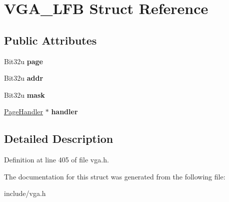 \hypertarget{structVGA__LFB}{\section{V\-G\-A\-\_\-\-L\-F\-B Struct Reference}
\label{structVGA__LFB}
}
\subsection*{Public Attributes}
\begin{DoxyCompactItemize}
\item 
\hypertarget{structVGA__LFB_ac33c6c75c1e64552c88293115b1c1196}{Bit32u {\bfseries page}}\label{structVGA__LFB_ac33c6c75c1e64552c88293115b1c1196}

\item 
\hypertarget{structVGA__LFB_ad82dd223ea49e44ed0958ff21ae15f1d}{Bit32u {\bfseries addr}}\label{structVGA__LFB_ad82dd223ea49e44ed0958ff21ae15f1d}

\item 
\hypertarget{structVGA__LFB_aaf0a31db50d61b55ed20a81fb94de57c}{Bit32u {\bfseries mask}}\label{structVGA__LFB_aaf0a31db50d61b55ed20a81fb94de57c}

\item 
\hypertarget{structVGA__LFB_ac84a223414c76edc5fbd6742bfd8c720}{\hyperlink{classPageHandler}{Page\-Handler} $\ast$ {\bfseries handler}}\label{structVGA__LFB_ac84a223414c76edc5fbd6742bfd8c720}

\end{DoxyCompactItemize}


\subsection{Detailed Description}


Definition at line 405 of file vga.\-h.



The documentation for this struct was generated from the following file\-:\begin{DoxyCompactItemize}
\item 
include/vga.\-h\end{DoxyCompactItemize}
